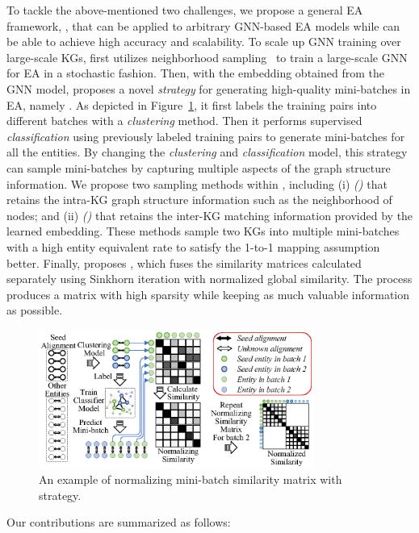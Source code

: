 To tackle the above-mentioned two challenges, we propose a general EA framework, \ClusterEA{}, that can be applied to arbitrary GNN-based EA models while can be able to achieve high accuracy and scalability. 
To scale up GNN training over large-scale KGs, \ClusterEA{} first utilizes neighborhood sampling~\cite{GraphSAGE17} to train a large-scale GNN for EA in a stochastic fashion.
Then, with the embedding obtained from the GNN model, \ClusterEA{} proposes a novel \emph{strategy} for generating high-quality mini-batches in EA, namely \Sampling{}. As depicted in Figure~\ref{fig:example}, it first labels the training pairs into different batches with a \emph{clustering} method. Then it performs supervised \emph{classification} using previously labeled training pairs to generate mini-batches for all the entities. By changing the \emph{clustering} and \emph{classification} model, this strategy can sample mini-batches by capturing multiple aspects of the graph structure information. We propose two sampling methods within \Sampling{}, including
(i)  \emph{\MetisFullName{} (\MetisGCN{})} that retains the intra-KG graph structure information such as the neighborhood of nodes; and 
(ii) \emph{\KMeansFullName{} (\KMeans{})} that retains the inter-KG matching information provided by the learned embedding. 
These methods sample two KGs into multiple mini-batches with a high entity equivalent rate to satisfy the 1-to-1 mapping assumption better. 
Finally, \ClusterEA{} proposes \Merging{}, which fuses the similarity matrices calculated separately using Sinkhorn iteration with normalized global similarity. The \Merging{} process produces a matrix with high sparsity while keeping as much valuable information as possible. 
\begin{figure}[t]
\centering
\hspace{-8mm}\includegraphics[width=3.55in]{figs/example.eps}
\vspace{-4mm}
\caption{An example of normalizing mini-batch similarity matrix with \Sampling{} strategy.}
\vspace{-4mm}
\label{fig:example}
\end{figure}
Our contributions are summarized as follows:

